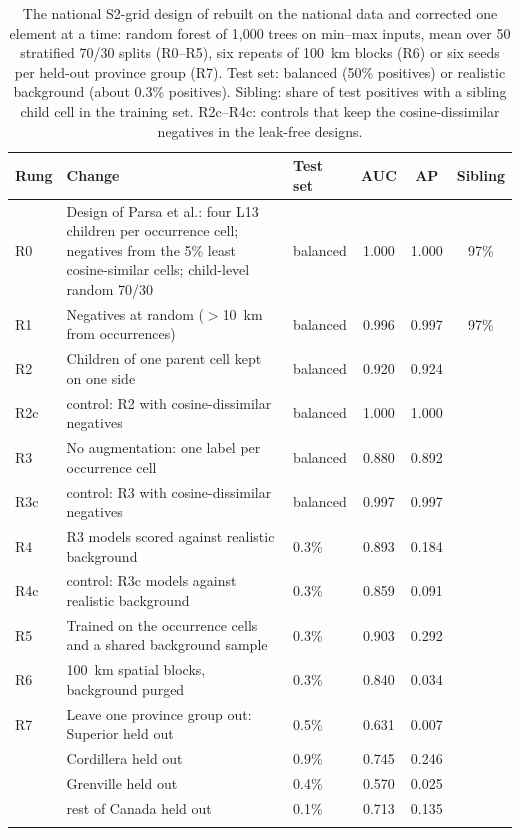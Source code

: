 \documentclass[pdflatex,sn-apa]{sn-jnl}
\begin{document}
\begin{table}[t]
\caption{The national S2-grid design of \citet{Parsa2024} rebuilt on the national data and corrected one element at a time: random forest of 1,000 trees on min--max inputs, mean over 50 stratified 70/30 splits (R0--R5), six repeats of 100~km blocks (R6) or six seeds per held-out province group (R7). Test set: balanced (50\% positives) or realistic background (about 0.3\% positives). Sibling: share of test positives with a sibling child cell in the training set. R2c--R4c: controls that keep the cosine-dissimilar negatives in the leak-free designs.}\label{tab:nat-ladder}
\scriptsize
\setlength{\tabcolsep}{2.5pt}
\begin{tabular*}{\textwidth}{@{\extracolsep\fill}lp{6.6cm}lccc}
\toprule
Rung & Change & Test set & AUC & AP & Sibling \\
\midrule
R0 & Design of Parsa et al.: four L13 children per occurrence cell; negatives from the 5\% least cosine-similar cells; child-level random 70/30 & balanced & 1.000 & 1.000 & 97\% \\
R1 & Negatives at random ($>$10~km from occurrences) & balanced & 0.996 & 0.997 & 97\% \\
R2 & Children of one parent cell kept on one side & balanced & 0.920 & 0.924 &  \\
R2c & \quad control: R2 with cosine-dissimilar negatives & balanced & 1.000 & 1.000 &  \\
R3 & No augmentation: one label per occurrence cell & balanced & 0.880 & 0.892 &  \\
R3c & \quad control: R3 with cosine-dissimilar negatives & balanced & 0.997 & 0.997 &  \\
R4 & R3 models scored against realistic background & 0.3\% & 0.893 & 0.184 &  \\
R4c & \quad control: R3c models against realistic background & 0.3\% & 0.859 & 0.091 &  \\
R5 & Trained on the occurrence cells and a shared background sample & 0.3\% & 0.903 & 0.292 &  \\
R6 & 100~km spatial blocks, background purged & 0.3\% & 0.840 & 0.034 &  \\
R7 & Leave one province group out: Superior held out & 0.5\% & 0.631 & 0.007 & \\
 & \quad Cordillera held out & 0.9\% & 0.745 & 0.246 & \\
 & \quad Grenville held out & 0.4\% & 0.570 & 0.025 & \\
 & \quad rest of Canada held out & 0.1\% & 0.713 & 0.135 & \\
\botrule
\end{tabular*}
\end{table}
\end{document}
